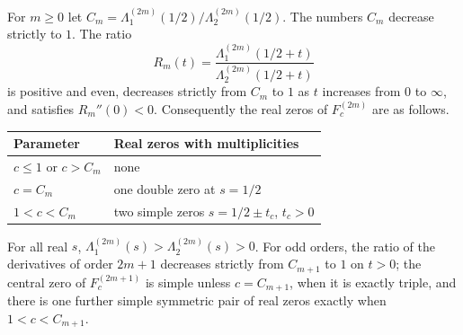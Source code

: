 \begin{theorem}\label{hec:thm:real47}
For $m\ge0$ let $C_m=\Lambda_1^{(2m)}(1/2)/\Lambda_2^{(2m)}(1/2)$. The numbers $C_m$ decrease strictly to
$1$. The ratio
\[
 R_m(t)=\frac{\Lambda_1^{(2m)}(1/2+t)}{\Lambda_2^{(2m)}(1/2+t)}
\]
is positive and even, decreases strictly from $C_m$ to $1$ as $t$ increases from $0$ to $\infty$, and
satisfies $R_m''(0)<0$. Consequently the real zeros of $F_c^{(2m)}$ are as follows.
\begin{center}\begin{tabular}{ll}\toprule
Parameter & Real zeros with multiplicities \\\midrule
$c\le1$ or $c>C_m$ & none\\
$c=C_m$ & one double zero at $s=1/2$\\
$1<c<C_m$ & two simple zeros $s=1/2\pm t_c$, $t_c>0$\\\bottomrule
\end{tabular}\end{center}
For all real $s$, $\Lambda_1^{(2m)}(s)>\Lambda_2^{(2m)}(s)>0$. For odd orders, the ratio of the derivatives
of order $2m+1$ decreases strictly from $C_{m+1}$ to $1$ on $t>0$; the central zero of $F_c^{(2m+1)}$ is
simple unless $c=C_{m+1}$, when it is exactly triple, and there is one further simple symmetric pair of
real zeros exactly when $1<c<C_{m+1}$.
\end{theorem}

